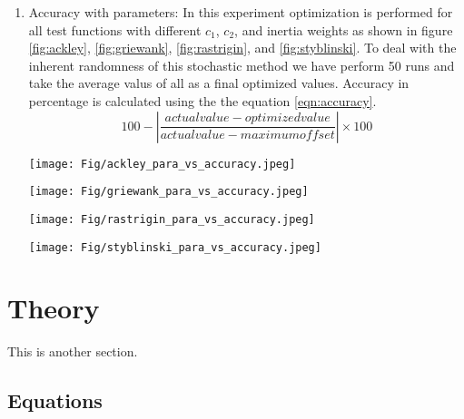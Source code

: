 \documentclass[paper,revised]{geophysics}
\begin{document}
\begin{enumerate}
	\item Accuracy with parameters: In this experiment optimization is performed for all test functions with different \(c_1\), \(c_2\), and inertia weights as shown in figure \ref{fig:ackley}, \ref{fig:griewank}, \ref{fig:rastrigin}, and \ref{fig:styblinski}. To deal with the inherent randomness of this stochastic method we have perform 50 runs and take the average valus of all as a final optimized values. Accuracy in percentage is calculated using the the equation \ref{eqn:accuracy}.
	\begin{equation}
		100 - \left| \frac{actual value - optimized value}{actual value - maximum offset} \right| \times 100
		\label{eqn:accuracy}
	\end{equation}
	\begin{sidewaysfigure}	
		\texttt{[image: Fig/ackley\_para\_vs\_accuracy.jpeg]}
		\caption{Optimization of the Ackley function with varying inertia weights, \(c_1\), and \(c_2\) coefficients.}
		\label{fig:ackley}
	\end{sidewaysfigure} 
	\begin{sidewaysfigure}	
		\texttt{[image: Fig/griewank\_para\_vs\_accuracy.jpeg]}
		\caption{Optimization of the Griewank function with varying inertia weights, \(c_1\), and \(c_2\) coefficients.}
		\label{fig:griewank}
	\end{sidewaysfigure} 
	\begin{sidewaysfigure}	
		\texttt{[image: Fig/rastrigin\_para\_vs\_accuracy.jpeg]}
		\caption{Optimization of the Rastrigin function with varying inertia weights, \(c_1\), and \(c_2\) coefficients.}
		\label{fig:rastrigin}
	\end{sidewaysfigure} 
	\begin{sidewaysfigure}	
		\texttt{[image: Fig/styblinski\_para\_vs\_accuracy.jpeg]}
		\caption{Optimization of the Styblinski-Tang function with varying inertia weights, \(c_1\), and \(c_2\) coefficients.}
		\label{fig:styblinski}
	\end{sidewaysfigure} 
\end{enumerate}
\section*{Theory}

This is another section. 

\subsection{Equations}
\end{document}
